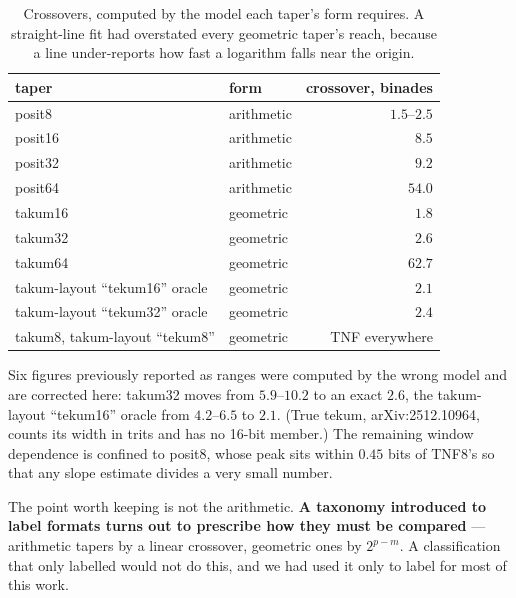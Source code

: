 \documentclass[11pt]{article}
\theoremstyle{definition}
\begin{document}
\begin{table}[t]\centering
\caption{Crossovers, computed by the model each taper's form requires. A
straight-line fit had overstated every geometric taper's reach, because a line
under-reports how fast a logarithm falls near the origin.}
\label{tab:crosscorrected}
\begin{tabular}{llr}
\toprule
taper & form & crossover, binades \\
\midrule
posit8 & arithmetic & $1.5$--$2.5$ \\
posit16 & arithmetic & $8.5$ \\
posit32 & arithmetic & $9.2$ \\
posit64 & arithmetic & $54.0$ \\
takum16 & geometric & $\mathbf{1.8}$ \\
takum32 & geometric & $\mathbf{2.6}$ \\
takum64 & geometric & $\mathbf{62.7}$ \\
takum-layout ``tekum16'' oracle & geometric & $\mathbf{2.1}$ \\
takum-layout ``tekum32'' oracle & geometric & $\mathbf{2.4}$ \\
takum8, takum-layout ``tekum8'' & geometric & TNF everywhere \\
\bottomrule
\end{tabular}
\end{table}

Six figures previously reported as ranges were computed by the wrong model and
are corrected here: takum32 moves from $5.9$--$10.2$ to an exact $2.6$, the
takum-layout ``tekum16'' oracle
from $4.2$--$6.5$ to $2.1$. (True tekum, arXiv:2512.10964, counts its width in
trits and has no 16-bit member.) The remaining window dependence is confined to
posit8, whose peak sits within $0.45$ bits of TNF8's so that any slope estimate
divides a very small number.

The point worth keeping is not the arithmetic. \textbf{A taxonomy introduced to label
formats turns out to prescribe how they must be compared} --- arithmetic tapers
by a linear crossover, geometric ones by $2^{p-m}$. A classification that only
labelled would not do this, and we had used it only to label for most of this
work.
\end{document}
